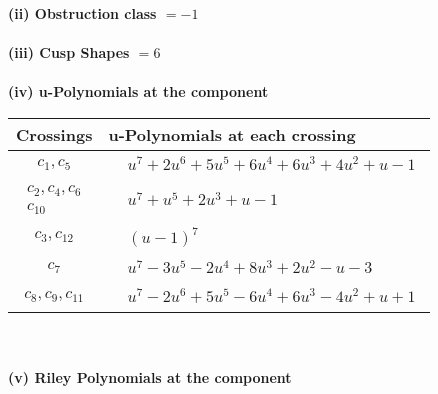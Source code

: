 \documentclass[1p]{elsarticle_modified}
\theoremstyle{definition}
\begin{document}
\flushleft \textbf{(ii) Obstruction class $= -1$}\\~\\
\flushleft \textbf{(iii) Cusp Shapes $= 6$}\\~\\
\newpage\renewcommand{\arraystretch}{1}
\flushleft \textbf{(iv) u-Polynomials at the component}\newline \\
\begin{tabular}{m{50pt}|m{274pt}}
Crossings & \hspace{64pt}u-Polynomials at each crossing \\
\hline $$\begin{aligned}c_{1},c_{5}\end{aligned}$$&$\begin{aligned}
&u^7+2 u^6+5 u^5+6 u^4+6 u^3+4 u^2+u-1
\end{aligned}$\\
\hline $$\begin{aligned}c_{2},c_{4},c_{6}\\c_{10}\end{aligned}$$&$\begin{aligned}
&u^7+u^5+2 u^3+u-1
\end{aligned}$\\
\hline $$\begin{aligned}c_{3},c_{12}\end{aligned}$$&$\begin{aligned}
&(u-1)^7
\end{aligned}$\\
\hline $$\begin{aligned}c_{7}\end{aligned}$$&$\begin{aligned}
&u^7-3 u^5-2 u^4+8 u^3+2 u^2- u-3
\end{aligned}$\\
\hline $$\begin{aligned}c_{8},c_{9},c_{11}\end{aligned}$$&$\begin{aligned}
&u^7-2 u^6+5 u^5-6 u^4+6 u^3-4 u^2+u+1
\end{aligned}$\\
\hline
\end{tabular}\\~\\
\newpage\renewcommand{\arraystretch}{1}
\flushleft \textbf{(v) Riley Polynomials at the component}\newline \\
\end{document}
